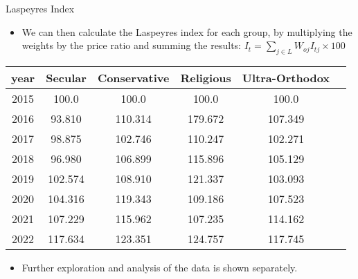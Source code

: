 \documentclass{beamer}
\begin{document}
\begin{frame}{Laspeyres Index}
    \begin{itemize}
        \item We can then calculate the Laspeyres index for each group, by multiplying the weights by the price ratio and summing the results: $I_{t}=\sum_{j\in L}W_{oj}I_{tj}\times 100$
    \end{itemize}
    \begin{table}
        \begin{tabular}{c c c c c c}
            \hline
            \textbf{year} & \textbf{Secular} & \textbf{Conservative} & \textbf{Religious} & \textbf{Ultra-Orthodox} \\
            \hline
            2015          & 100.0            & 100.0                 & 100.0              & 100.0                   \\
            \hline
            2016          & 93.810           & 110.314               & 179.672            & 107.349                 \\
            \hline
            2017          & 98.875           & 102.746               & 110.247            & 102.271                 \\
            \hline
            2018          & 96.980           & 106.899               & 115.896            & 105.129                 \\
            \hline
            2019          & 102.574          & 108.910               & 121.337            & 103.093                 \\
            \hline
            2020          & 104.316          & 119.343               & 109.186            & 107.523                 \\
            \hline
            2021          & 107.229          & 115.962               & 107.235            & 114.162                 \\
            \hline
            2022          & 117.634          & 123.351               & 124.757            & 117.745                 \\
            \hline
        \end{tabular}
    \end{table}
    \begin{itemize}
        \item Further exploration and analysis of the data is shown separately.
    \end{itemize}
\end{frame}
\end{document}
